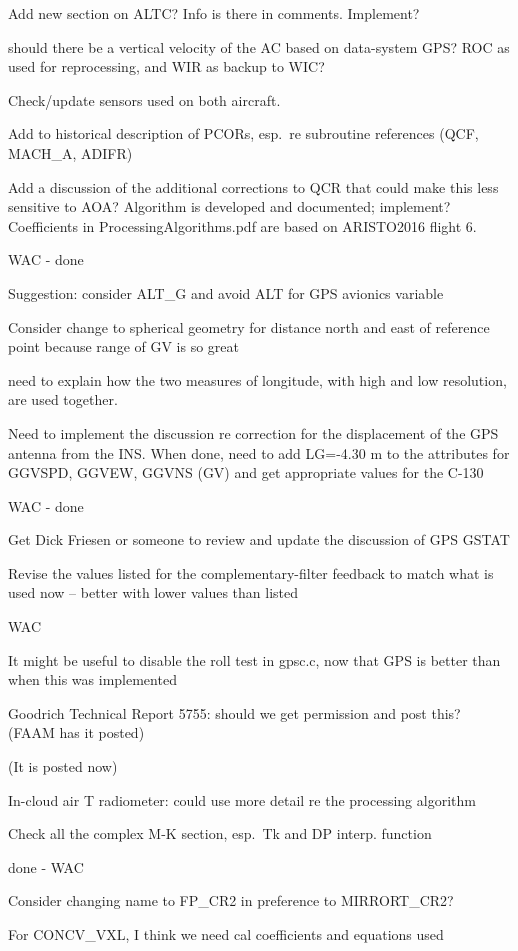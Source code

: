 \documentclass[
]{book}
\begin{document}
Add new section on ALTC? Info is there in comments. Implement?

should there be a vertical velocity of the AC based on data-system GPS? ROC as used for reprocessing, and WIR as backup to WIC?

Check/update sensors used on both aircraft.

Add to historical description of PCORs, esp.~re subroutine references (QCF, MACH\_A, ADIFR)

Add a discussion of the additional corrections to QCR that could make this less sensitive to AOA? Algorithm is developed and documented; implement? Coefficients in ProcessingAlgorithms.pdf are based on ARISTO2016 flight 6.

WAC - done

Suggestion: consider ALT\_G and avoid ALT for GPS avionics variable

Consider change to spherical geometry for distance north and east of reference point because range of GV is so great

need to explain how the two measures of longitude, with high and low resolution, are used together.

Need to implement the discussion re correction for the displacement of the GPS antenna from the INS. When done, need to add LG=-4.30 m to the attributes for GGVSPD, GGVEW, GGVNS (GV) and get appropriate values for the C-130

WAC - done

Get Dick Friesen or someone to review and update the discussion of GPS GSTAT

Revise the values listed for the complementary-filter feedback to match what is used now -- better with lower values than listed

WAC

It might be useful to disable the roll test in gpsc.c, now that GPS is better than when this was implemented

Goodrich Technical Report 5755: should we get permission and post this? (FAAM has it posted)

(It is posted now)

In-cloud air T radiometer: could use more detail re the processing algorithm

Check all the complex M-K section, esp.~{Tk} and DP interp. function

done - WAC

Consider changing name to FP\_CR2 in preference to MIRRORT\_CR2?

For CONCV\_VXL, I think we need cal coefficients and equations used
\end{document}

